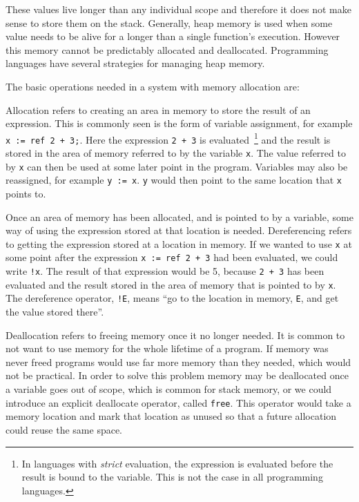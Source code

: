 These values live longer than any individual scope and therefore
it does not make sense to store them on the stack. Generally, heap memory is
used when some value needs to be alive for a longer than a single function's
execution. However this memory cannot be predictably allocated and deallocated.
Programming languages have several strategies for managing heap memory.

The basic operations needed in a system with memory allocation are:
\begin{description}[style=nextline]
    \item[Allocation]
        Allocation refers to creating an area in memory to store the result of
        an expression. This is commonly seen is the form of variable
        assignment, for example \lstinline{x := ref 2 + 3;}. Here the
        expression \lstinline{2 + 3} is evaluated~\footnote{In languages with
        \textit{strict} evaluation, the expression is evaluated before the
        result is bound to the variable. This is not the case in all
        programming languages.} and the result is stored in the area of memory
        referred to by the variable \lstinline{x}. The value referred to by
        \lstinline{x} can then be used at some later point in the program.
        Variables may also be reassigned, for example \lstinline{y := x}.
        \lstinline{y} would then point to the same location that \lstinline{x}
        points to.
    \item[Dereference]
        Once an area of memory has been allocated, and is pointed to by a
        variable, some way of using the expression stored at that location is
        needed. Dereferencing refers to getting the expression stored at a
        location in memory. If we wanted to use \lstinline{x} at some point
        after the expression \lstinline{x := ref 2 + 3} had been evaluated, we
        could write \lstinline{!x}. The result of that expression would be 5,
        because \lstinline{2 + 3} has been evaluated and the result stored in
        the area of memory that is pointed to by \lstinline{x}. The dereference
        operator, \lstinline{!E}, means ``go to the location in memory,
        \lstinline{E}, and get the value stored there''. 
    \item[Deallocation]
        Deallocation refers to freeing memory once it no longer needed. It is
        common to not want to use memory for the whole lifetime of a program.
        If memory was never freed programs would use far more memory than they
        needed, which would not be practical. In order to solve this problem
        memory may be deallocated once a variable goes out of scope, which is
        common for stack memory, or we could introduce an explicit deallocate
        operator, called \lstinline{free}. This operator would take a memory
        location and mark that location as unused so that a future allocation
        could reuse the same space.
\end{description}

